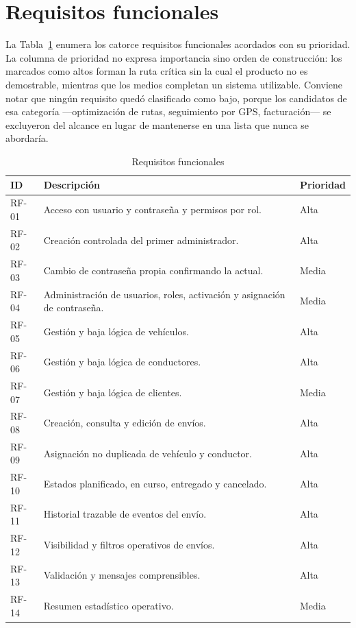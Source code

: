 \clearpage
\section{Requisitos funcionales}

La Tabla~\ref{tab:rf} enumera los catorce requisitos funcionales acordados con su prioridad. La columna de prioridad no expresa importancia sino orden de construcción: los marcados como altos forman la ruta crítica sin la cual el producto no es demostrable, mientras que los medios completan un sistema utilizable. Conviene notar que ningún requisito quedó clasificado como bajo, porque los candidatos de esa categoría ---optimización de rutas, seguimiento por GPS, facturación--- se excluyeron del alcance en lugar de mantenerse en una lista que nunca se abordaría.

\begin{longtable}{p{1.0cm}p{7.9cm}p{1.5cm}}
\caption{Requisitos funcionales}\label{tab:rf}\\
\hline ID & Descripción & Prioridad \\ \hline
RF-01 & Acceso con usuario y contraseña y permisos por rol. & Alta \\
RF-02 & Creación controlada del primer administrador. & Alta \\
RF-03 & Cambio de contraseña propia confirmando la actual. & Media \\
RF-04 & Administración de usuarios, roles, activación y asignación de contraseña. & Media \\
RF-05 & Gestión y baja lógica de vehículos. & Alta \\
RF-06 & Gestión y baja lógica de conductores. & Alta \\
RF-07 & Gestión y baja lógica de clientes. & Media \\
RF-08 & Creación, consulta y edición de envíos. & Alta \\
RF-09 & Asignación no duplicada de vehículo y conductor. & Alta \\
RF-10 & Estados planificado, en curso, entregado y cancelado. & Alta \\
RF-11 & Historial trazable de eventos del envío. & Alta \\
RF-12 & Visibilidad y filtros operativos de envíos. & Alta \\
RF-13 & Validación y mensajes comprensibles. & Alta \\
RF-14 & Resumen estadístico operativo. & Media \\
\hline
\end{longtable}

